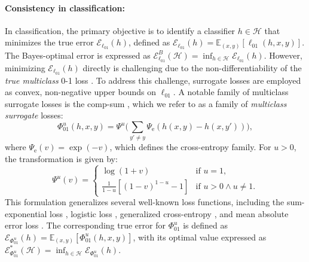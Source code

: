 \paragraph{Consistency in classification:}  
In classification, the primary objective is to identify a classifier \( h \in \mathcal{H} \) that minimizes the true error \(\mathcal{E}_{\ell_{01}}(h)\), defined as \(\mathcal{E}_{\ell_{01}}(h) = \mathbb{E}_{(x,y)} [\ell_{01}(h,x,y)]\). The Bayes-optimal error is expressed as \(\mathcal{E}^B_{\ell_{01}}(\mathcal{H}) = \inf_{h \in \mathcal{H}} \mathcal{E}_{\ell_{01}}(h)\). However, minimizing \(\mathcal{E}_{\ell_{01}}(h)\) directly is challenging due to the non-differentiability of the \textit{true multiclass} 0-1 loss \citep{Statistical, Steinwart2007HowTC, Awasthi_Mao_Mohri_Zhong_2022_multi}.  To address this challenge, surrogate losses are employed as convex, non-negative upper bounds on \( \ell_{01} \). A notable family of multiclass surrogate losses is the comp-sum \citep{Foundations, mao2023crossentropylossfunctionstheoretical}, which we refer to as a family of \textit{multiclass surrogate} losses:
\begin{equation}\label{eq:multi}
    \Phi_{01}^u(h, x, y) = \Psi^u\Big(\sum_{y' \neq y} \Psi_{\text{e}}(h(x, y) - h(x, y'))\Big),
\end{equation}
where \(\Psi_{\text{e}}(v) = \exp(-v)\), which defines the cross-entropy family. For \( u > 0 \), the transformation is given by:
\begin{equation}
    \Psi^{u}(v) = \begin{cases}
         \log(1 + v) & \text{if } u = 1, \\
        \frac{1}{1 - u} \left[(1 - v)^{1 - u} - 1\right] & \text{if } u > 0 \land u \neq 1.
    \end{cases}
\end{equation}
This formulation generalizes several well-known loss functions, including the sum-exponential loss \citep{weston1998multi}, logistic loss \citep{Ohn_Aldrich1997-wn}, generalized cross-entropy \citep{zhang2018generalizedcrossentropyloss}, and  mean absolute error loss \citep{Ghosh}. The corresponding true error for \( \Phi_{01}^u \) is defined as \(\mathcal{E}_{\Phi_{01}^u}(h) = \mathbb{E}_{(x, y)} [\Phi_{01}^u(h, x, y)]\), with its optimal value expressed as \(\mathcal{E}^\ast_{\Phi_{01}^u}(\mathcal{H}) = \inf_{h \in \mathcal{H}} \mathcal{E}_{\Phi_{01}^u}(h)\).


